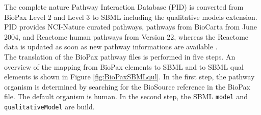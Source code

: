 \documentclass{bioinfo}
\begin{document}
\begin{methods}
%
The complete nature Pathway Interaction Database (PID) is converted from BioPax Level 2 and Level 3 to SBML including the qualitative models extension.
PID provides NCI-Nature curated pathways, pathways from BioCarta from June 2004, and Reactome human pathways from Version 22, whereas the Reactome data is updated as soon as new pathway informations are available \citep{Schaefer2009}.\\
The translation of the BioPax pathway files is performed in five steps.
An overview of the mapping from BioPax elements to SBML and to SBML qual elements is shown in Figure \ref{fig:BioPaxSBMLqul}.
In the first step, the pathway organism is determined by searching for the BioSource reference in the BioPax file.
The default organism is human.
In the second step, the SBML \texttt{model} and \texttt{qualitativeModel} are build.

\end{methods}
\end{document}
